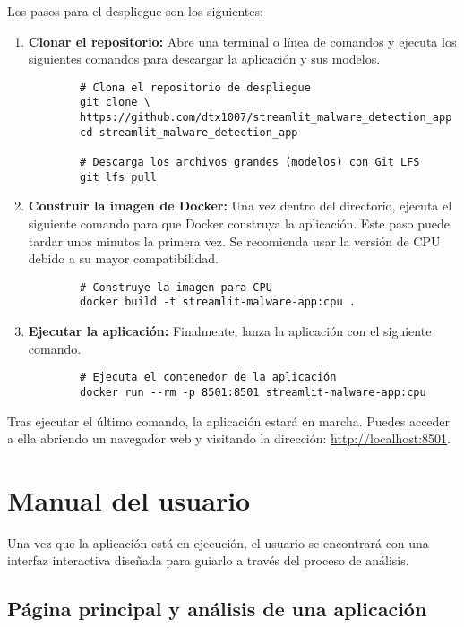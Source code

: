 Los pasos para el despliegue son los siguientes:

\begin{enumerate}
	\item \textbf{Clonar el repositorio:} Abre una terminal o línea de comandos y ejecuta los siguientes comandos para descargar la aplicación y sus modelos.
	\begin{verbatim}
		# Clona el repositorio de despliegue
		git clone \
		https://github.com/dtx1007/streamlit_malware_detection_app
		cd streamlit_malware_detection_app
		
		# Descarga los archivos grandes (modelos) con Git LFS
		git lfs pull
	\end{verbatim}
	
	\item \textbf{Construir la imagen de Docker:} Una vez dentro del directorio, ejecuta el siguiente comando para que Docker construya la aplicación. Este paso puede tardar unos minutos la primera vez. Se recomienda usar la versión de CPU debido a su mayor compatibilidad.
	\begin{verbatim}
		# Construye la imagen para CPU
		docker build -t streamlit-malware-app:cpu .
	\end{verbatim}
	
	\item \textbf{Ejecutar la aplicación:} Finalmente, lanza la aplicación con el siguiente comando.
	\begin{verbatim}
		# Ejecuta el contenedor de la aplicación
		docker run --rm -p 8501:8501 streamlit-malware-app:cpu
	\end{verbatim}
\end{enumerate}

Tras ejecutar el último comando, la aplicación estará en marcha. Puedes acceder a ella abriendo un navegador web y visitando la dirección: \url{http://localhost:8501}.

\section{Manual del usuario}

Una vez que la aplicación está en ejecución, el usuario se encontrará con una interfaz interactiva diseñada para guiarlo a través del proceso de análisis.

\subsection{Página principal y análisis de una aplicación}

